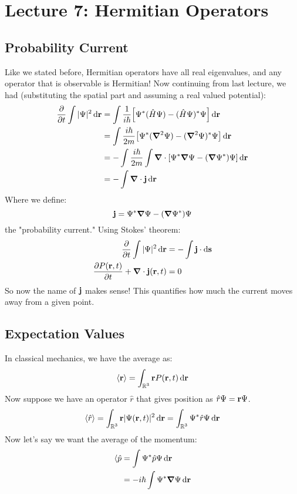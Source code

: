 \section{Lecture 7: Hermitian Operators}

\subsection{Probability Current}
Like we stated before, Hermitian operators have all real eigenvalues, and any operator that is observable is Hermitian! Now continuing from last lecture,
we had (substituting the spatial part and assuming a real valued potential):
\begin{align*}
    \partialderivative{}{t} \int | \Psi |^2 \dd{\mbf{r}} &= \int \frac{1}{i \hbar} \qty[\Psi^* (\hat{H} \Psi) - (\hat{H} \Psi)^* \Psi] \dd{\mbf{r}} \\
    &= \int \frac{i \hbar}{2m} \qty[\Psi^* (\grad^2 \Psi) - (\grad^2 \Psi)^* \Psi] \dd{\mbf{r}} \\
    &= - \int \frac{i \hbar}{2m} \int \mbf{\grad} \cdot [\Psi^* \mbf{\grad} \Psi - (\mbf{\grad} \Psi^*) \Psi] \dd{\mbf{r}} \\
    &= -\int \mbf{\grad} \cdot \mbf{j} \dd{\mbf{r}} \\
\end{align*}
Where we define:
\[ \mathbf{j} = \Psi^* \mathbf{\grad} \Psi - (\mathbf{\grad} \Psi^*) \Psi \]
the "probability current." Using Stokes' theorem:
\begin{align*}
    \partialderivative{}{t} \int | \Psi |^2 \dd{\mbf{r}} &= - \int \mbf{j} \cdot \dd{\mbf{s}} \\
    \partialderivative{P(\mbf{r}, t)}{t} + \mbf{\grad} \cdot \mbf{j}(\mbf{r}, t) &= 0
\end{align*}
So now the name of $\mathbf{j}$ makes sense! This quantifies how much the current moves away from a given point.

\subsection{Expectation Values}
In classical mechanics, we have the average as:
\[ \langle \mathbf{r} \rangle = \int_{\operatorname{\mathbb{R}}^3} \mathbf{r} P(\mathbf{r}, t) \dd{\mathbf{r}} \]
Now suppose we have an operator $\hat{r}$ that gives position as $\hat{r} \Psi = \mathbf{r} \Psi$.
\[ \langle \hat{r} \rangle = \int_{\operatorname{\mathbb{R}}^3} \mathbf{r} |\Psi(\mathbf{r}, t)|^2 \dd{\mathbf{r}} = \int_{\operatorname{\mathbb{R}}^3} \Psi^* \hat{r} \Psi \dd{\mathbf{r}} \]
Now let's say we want the average of the momentum:
\begin{align*}
    \langle \hat{p} &= \int \Psi^* \hat{p} \Psi \dd{\mathbf{r}} \\
    &= -i\hbar \int \Psi^* \grad \Psi \dd{\mathbf{r}} \\
\end{align*} 

